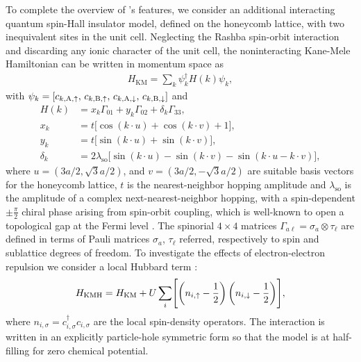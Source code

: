 \documentclass[edipack_sp.tex]{subfiles}
\begin{document}
To complete the overview of \NAME's features, we consider an additional interacting quantum spin-Hall insulator model, defined on the honeycomb lattice, with two inequivalent sites in the unit cell. Neglecting the Rashba spin-orbit interaction and discarding any ionic character of the unit cell, the noninteracting Kane-Mele Hamiltonian \cite{Kane2005PRLa,Kane2005PRL} can be written in momentum space as
\begin{align*}
    H_\mathrm{KM} = \sum_{{k}} \psi^\dagger_{{k}} H({k}) \psi_{{k}},
\end{align*}
with $\psi_{{k}} = [c_{{k},\mathrm{A},\uparrow},\,c_{{k},\mathrm{B},\uparrow},\,c_{{k},\mathrm{A},\downarrow},\,c_{{k},\mathrm{B},\downarrow}]$ and
    \begin{align}
    H({k}) 
    &= x_{{k}}\Gamma_{01} + y_{{k}}\Gamma_{02} + \delta_{{k}}\Gamma_{33}, \label{eq:Hk_kanemele}\\[1mm]
   x_{{k}}&=t\bigl[\cos({k}\cdot{u})+\cos({k}\cdot{v})+1\bigr],\nonumber\\
   y_{{k}}&=t\bigl[\sin({k}\cdot{u})+\sin({k}\cdot{v})\bigr],\nonumber \\
   \delta_{{k}}&=2\lambda_\mathrm{so}\bigl[\sin({k}\cdot{u})-\sin({k}\cdot{v}) - \sin({k}\cdot{u} -{k}\cdot{v})\bigr], \nonumber
\end{align}
where ${u} = (3a/2, \sqrt{3}a/2)$, and ${v} = (3a/2, -\sqrt{3}a/2)$ 
are suitable basis vectors for the honeycomb lattice, $t$ is the
nearest-neighbor hopping amplitude and $\lambda_\mathrm{so}$ is 
the amplitude of a complex next-nearest-neighbor hopping,
with a spin-dependent $\pm\tfrac{\pi}{2}$ chiral phase arising from spin-orbit coupling, which is well-known to open a topological gap at the Fermi level \cite{Kane2005PRLa,Kane2005PRL}.
The spinorial $4\times4$ matrices $\Gamma_{a\ell} = \sigma_a\otimes\tau_\ell$ are 
defined in terms of Pauli matrices $\sigma_a$, $\tau_\ell$ referred, respectively 
to spin and sublattice degrees of freedom.
To investigate the effects of electron-electron repulsion we consider a local Hubbard term \cite{Hohenadler2013ROPIP,Rachel2018ROPIP}:
\begin{equation}
    H_\mathrm{KMH}  = H_\mathrm{KM} 
    + U\sum_{i}\Biggl[
                        \left(n_{i,\uparrow} - \frac{1}{2}\right)
                        \left(n_{i,\downarrow} - \frac{1}{2}\right)
                      \Biggr],
    \label{eq:KMHmodel}
\end{equation}
where $n_{i,\sigma}=c^\dagger_{i,\sigma}c_{i,\sigma}$ are the 
local spin-density operators. The interaction is written in an explicitly 
particle-hole symmetric form so that the model is at half-filling for zero
chemical potential.
\end{document}

